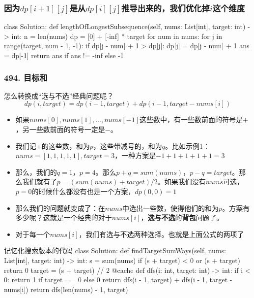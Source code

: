 \begin{frame}[fragile]          %
  \frametitle{因为$dp[i+1][j]$是从$dp[i][j]$推导出来的，我们优化掉$i$这个维度}
  \begin{codeblock}[language=python]{}
class Solution:
    def lengthOfLongestSubsequence(self, nums: List[int], target: int) -> int:
        n = len(nums)
        dp = [0] + [-inf] * target
        for num in nums:
            for j in range(target, num - 1, -1):
                if dp[j - num] + 1 > dp[j]:
                    dp[j] = dp[j - num] + 1
        ans = dp[-1]
        return ans if ans != -inf else -1
  \end{codeblock}
\end{frame}


\begin{frame}[fragile]          %
  \frametitle{\textsc{494. 目标和}}
  \begin{alertblock}{怎么转换成“选与不选”经典问题呢？}
    \begin{equation*}
      dp(i,target)=dp(i-1,target)+dp(i-1,target-nums[i])
    \end{equation*}
  \end{alertblock}
  \begin{itemize}
    \item 如果$nums[0],nums[1],\dots,nums[-1]$这些数中，有一些数前面的符号是$+$，另一些数前面的符号一定是$-$。
    \item 我们记$+$的这些数，和为$p$，这些带减号的，和为$q$。比如示例1：$nums=[1,1,1,1,1],target=3$，一种方案是$-1+1+1+1+1=3$
    \item 那么，我们的$q=1$，$p=4$。那么$p+q=sum(nums)$，$p-q=target$。那么我们就有了$p=(sum(nums)+target)/2$。如果我们没有$nums$可选，$p=0$的时候什么都没有也是一个方案，$dp(0,0)=1$
    \item 那么我们的问题就变成了：在$nums$中选出一些数，使得他们的和为$p$。方案有多少呢？这就是一个经典的对于$nums[i]$，\textbf{选与不选}的\textbf{背包}问题了。
    \item 对于每一个$nums[i]$，我们有选与不选两种选择。也就是上面公式的两项了
  \end{itemize}
\end{frame}



\begin{frame}[fragile]          %
  
  \begin{codeblock}[language=python]{记忆化搜索版本的代码}
class Solution:
    def findTargetSumWays(self, nums: List[int], target: int) -> int:
        s = sum(nums)
        if (s + target) < 0 or (s + target) %
            return 0
        target = (s + target) // 2
        @cache
        def dfs(i: int, target: int) -> int:
            if i < 0:
                return 1 if target == 0 else 0
            return dfs(i - 1, target) + dfs(i - 1, target - nums[i])
        return dfs(len(nums) - 1, target)
  \end{codeblock}
\end{frame}


